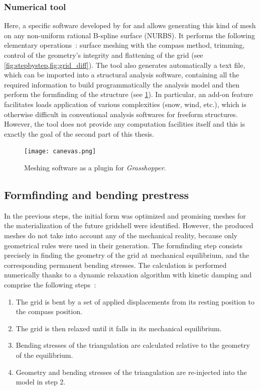 \subsubsection{Numerical tool}
Here, a specific software developed by \citet{DuPeloux2011} for \rhino{} and \grasshopper{} allows generating this kind of mesh on any non-uniform rational B-spline surface (NURBS). It performs the following elementary operations~: surface meshing with the compass method, trimming, control of the geometry’s integrity and flattening of the grid (see \cref{fig:stepbystep,fig:grid_diff}). The tool also generates automatically a text file, which can be imported into a structural analysis software, containing all the required information to build programmatically the analysis model and then perform the formfinding of the structure (see \cref{fig:canevas}). In particular, an add-on feature facilitates loads application of various complexities (snow, wind, etc.), which is otherwise difficult in conventional analysis softwares for freeform structures. However, the tool does not provide any computation facilities itself and this is exactly the goal of the second part of this thesis.
\begin{figure}[h]
	\centering
	\texttt{[image: canevas.png]}
	\caption{Meshing software as a plugin for \emph{Grasshopper}.}
	\label{fig:canevas}
\end{figure}

\subsection{Formfinding and bending prestress}
In the previous steps, the initial form was optimized and promising meshes for the materialization of the future gridshell were identified. However, the produced meshes do not take into account any of the mechanical reality, because only geometrical rules were used in their generation. The formfinding step consists precisely in finding the geometry of the grid at mechanical equilibrium, and the corresponding permanent bending stresses. The calculation is performed numerically thanks to a dynamic relaxation algorithm with kinetic damping and comprise the following steps~:
\begin{enumerate}
\item The grid is bent by a set of applied displacements from its resting position to the compass position.
\item The grid is then relaxed until it falls in its mechanical equilibrium.
\item Bending stresses of the triangulation are calculated relative to the geometry of the equilibrium.
\item Geometry and bending stresses of the triangulation are re-injected into the model in step 2.
\end{enumerate}

